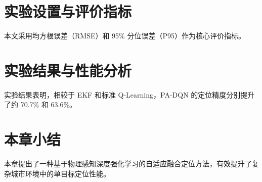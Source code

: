\section{实验设置与评价指标}
\label{sec:3_6}

本文采用均方根误差（RMSE）和 95\% 分位误差（P95）作为核心评价指标。

\section{实验结果与性能分析}
\label{sec:3_7}

实验结果表明，相较于 EKF 和标准 Q-Learning，PA-DQN 的定位精度分别提升了约 70.7\% 和 63.6\%。

\section{本章小结}
\label{sec:3_8}

本章提出了一种基于物理感知深度强化学习的自适应融合定位方法，有效提升了复杂城市环境中的单目标定位性能。
